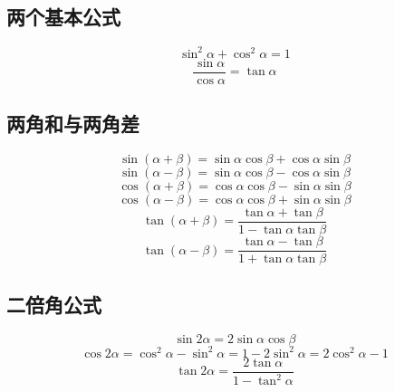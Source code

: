 
\begin{issues}
\issueDraft
{}
\end{issues}

\subsection{两个基本公式}
\begin{equation}
\sin^2\alpha + \cos^2\alpha = 1
\end{equation}
\begin{equation}
\frac{\sin\alpha}{\cos\alpha} = \tan\alpha
\end{equation}

\subsection{两角和与两角差}
\begin{equation}
\sin(\alpha + \beta) = \sin\alpha \cos\beta + \cos\alpha \sin\beta
\end{equation}
\begin{equation}
\sin(\alpha - \beta) = \sin\alpha \cos\beta - \cos\alpha \sin\beta
\end{equation}
\begin{equation}
\cos(\alpha + \beta) = \cos\alpha \cos\beta - \sin\alpha \sin\beta
\end{equation}
\begin{equation}
\cos(\alpha - \beta) = \cos\alpha \cos\beta + \sin\alpha \sin\beta
\end{equation}
\begin{equation}
\tan(\alpha + \beta) = \frac{\tan\alpha+\tan\beta}{1-\tan\alpha \tan\beta}
\end{equation}
\begin{equation}
\tan(\alpha - \beta) = \frac{\tan\alpha - \tan\beta}{1+\tan\alpha \tan\beta}
\end{equation}

\subsection{二倍角公式}
\begin{equation}
\sin2\alpha = 2\sin\alpha \cos\beta
\end{equation}
\begin{equation}
\cos2\alpha = \cos^2\alpha - \sin^2\alpha = 1 - 2\sin^2\alpha = 2\cos^2\alpha -1
\end{equation}
\begin{equation}
\tan2\alpha = \frac{2\tan\alpha}{1-\tan^2\alpha}
\end{equation}

